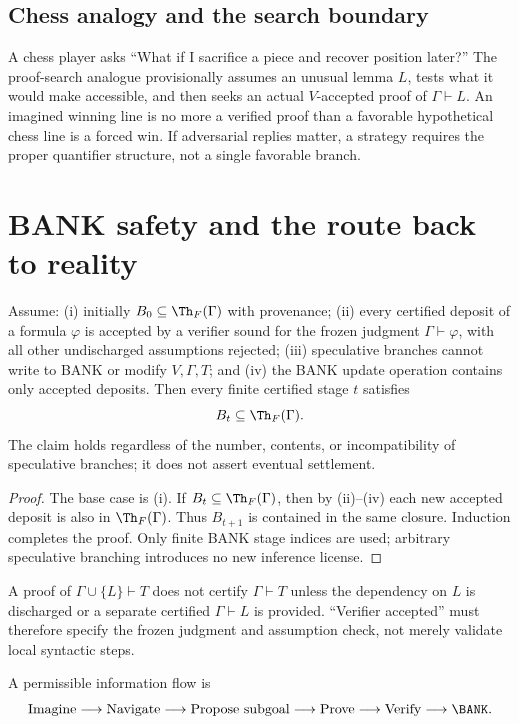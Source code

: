 \subsection{Chess analogy and the search boundary}
A chess player asks ``What if I sacrifice a piece and recover position later?'' The proof-search analogue provisionally assumes an unusual lemma $L$, tests what it would make accessible, and then seeks an actual $V$-accepted proof of $\Gamma\vdash L$. An imagined winning line is no more a verified proof than a favorable hypothetical chess line is a forced win. If adversarial replies matter, a strategy requires the proper quantifier structure, not a single favorable branch.

\section{BANK safety and the route back to reality}
\begin{theorem}\label{thm:safe}
Assume: (i) initially $B_0\subseteq\Th_F(\Gamma)$ with provenance; (ii) every certified deposit of a formula $\varphi$ is accepted by a verifier sound for the frozen judgment $\Gamma\vdash\varphi$, with all other undischarged assumptions rejected; (iii) speculative branches cannot write to BANK or modify $V,\Gamma,T$; and (iv) the BANK update operation contains only accepted deposits. Then every finite certified stage $t$ satisfies
\[B_t\subseteq\Th_F(\Gamma).\]
The claim holds regardless of the number, contents, or incompatibility of speculative branches; it does not assert eventual settlement.
\end{theorem}
\begin{proof}
The base case is (i). If $B_t\subseteq\Th_F(\Gamma)$, then by (ii)--(iv) each new accepted deposit is also in $\Th_F(\Gamma)$. Thus $B_{t+1}$ is contained in the same closure. Induction completes the proof. Only finite BANK stage indices are used; arbitrary speculative branching introduces no new inference license.
\end{proof}
\begin{remark}
A proof of $\Gamma\cup\{L\}\vdash T$ does not certify $\Gamma\vdash T$ unless the dependency on $L$ is discharged or a separate certified $\Gamma\vdash L$ is provided. ``Verifier accepted'' must therefore specify the frozen judgment and assumption check, not merely validate local syntactic steps.
\end{remark}
A permissible information flow is
\[\mathrm{Imagine}\longrightarrow\mathrm{Navigate}\longrightarrow\mathrm{Propose\ subgoal}\longrightarrow\mathrm{Prove}\longrightarrow\mathrm{Verify}\longrightarrow\BANK.\]

